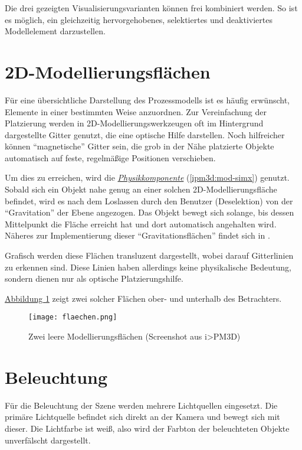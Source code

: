 \documentclass[a4paper,10pt]{sphinxmanual}
\begin{document}
Die drei gezeigten Visualisierungsvarianten können frei kombiniert werden.
So ist es möglich, ein gleichzeitig hervorgehobenes, selektiertes und deaktiviertes Modellelement darzustellen.


\section{2D-Modellierungsflächen}
\label{visualisierung:d-modellierungsflachen}\label{visualisierung:modellierungsflaechen}
Für eine übersichtliche Darstellung des Prozessmodells ist es häufig erwünscht, Elemente in einer bestimmten Weise anzuordnen.
Zur Vereinfachung der Platzierung werden in 2D-Modellierungswerkzeugen oft im Hintergrund dargestellte Gitter genutzt, die eine optische Hilfe darstellen.
Noch hilfreicher können "`magnetische"' Gitter sein, die grob in der Nähe platzierte Objekte automatisch auf feste, regelmäßige Positionen verschieben.

Um dies zu erreichen, wird die {\hyperref[ipm3d:mod-simx]{\emph{Physikkomponente}}} (\autoref*{ipm3d:mod-simx}) genutzt.
Sobald sich ein Objekt nahe genug an einer solchen 2D-Modellierungsfläche befindet, wird es nach dem Loslassen durch den Benutzer (Deselektion) von der "`Gravitation"' der Ebene angezogen.
Das Objekt bewegt sich solange, bis dessen Mittelpunkt die Fläche erreicht hat und dort automatisch angehalten wird.
Näheres zur Implementierung dieser "`Gravitationsflächen"' findet sich in \cite{buchi}.

Grafisch werden diese Flächen transluzent dargestellt, wobei darauf Gitterlinien zu erkennen sind.
Diese Linien haben allerdings keine physikalische Bedeutung, sondern dienen nur als optische Platzierungshilfe.

\hyperref[visualisierung:modellierungsflaeche]{Abbildung  \ref*{visualisierung:modellierungsflaeche}} zeigt zwei solcher Flächen ober- und unterhalb des Betrachters.
\begin{figure}[htbp]
\centering
\capstart

\texttt{[image: flaechen.png]}
\caption{Zwei leere Modellierungsflächen (Screenshot aus i\textgreater{}PM3D)}\label{visualisierung:modellierungsflaeche}\end{figure}


\section{Beleuchtung}
\label{visualisierung:id6}\label{visualisierung:beleuchtung}
Für die Beleuchtung der Szene werden mehrere Lichtquellen eingesetzt. Die primäre Lichtquelle befindet sich direkt an der Kamera und bewegt sich mit dieser.
Die Lichtfarbe ist weiß, also wird der Farbton der beleuchteten Objekte unverfälscht dargestellt.
\end{document}
